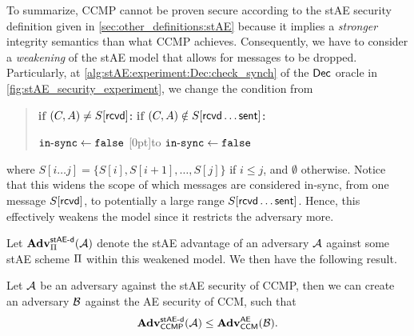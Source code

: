 To summarize,
CCMP cannot be proven secure according to the stAE security definition given in \cref{sec:other_definitions:stAE} because it implies a \emph{stronger} integrity semantics than what CCMP achieves.
Consequently,
we have to consider a \emph{weakening} of the stAE model that allows for messages to be dropped.
Particularly,
at  \cref{alg:stAE:experiment:Dec:check_synch} of the $\staedec$ oracle in \cref{fig:stAE_security_experiment},
we change the condition  from
\begin{quote}
	\hspace*{\algorithmicindent}\textbf{if} $(C,A) \neq S[\received]$\textbf{:}  \hspace*{1cm} \phantom{to} \hspace*{1cm}	\textbf{if} $(C,A) \notin S[\received \dotso \sent]$\textbf{:}
	
	\hspace*{\algorithmicindent}\hspace*{0.3cm} $\phase \gets \FALSE$ \hspace*{1cm} \raisebox{0.5\baselineskip}[0pt]{to} \hspace*{0.7cm}	
	\hspace*{\algorithmicindent} $\phase \gets \FALSE$
\end{quote}
where $S[i \dotso j] = \lbrace S[i], S[i+1], \dotsc, S[j] \rbrace$ if $i \leq j$,
and $\emptyset$ otherwise.
Notice that this widens the scope of which messages are considered in-sync,
from one message $S[\received]$,
to potentially a large range $S[\received \dotso \sent]$.
Hence, this effectively weakens the model since it restricts the adversary more. 


Let $\adv_{\protocol}^{\staesecd}(\A)$ denote the stAE advantage of an adversary $\A$ against some stAE scheme $\protocol$ within this weakened model.
We then have the following result.


\begin{theorem}
Let $\A$ be an adversary against the stAE security of CCMP,
then we can create an adversary $\A[B]$ against the AE security of CCM,
such that
\begin{equation}
	\adv_{\ccmp}^{\staesecd}(\A) \leq \adv_{\ccm}^{\aesec}(\A[B]) .
\end{equation}
\end{theorem}

